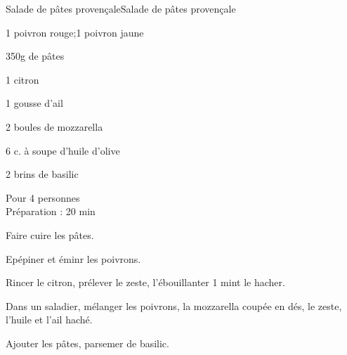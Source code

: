 \begin{recette}{Salade de pâtes provençale}{Salade de pâtes provençale}

\begin{ingredients}
1 poivron rouge;1 poivron jaune\par
350g de pâtes\par
1 citron\par
1 gousse d'ail\par
2 boules de mozzarella\par
6 c. à soupe d'huile d'olive\par
2 brins de basilic\par
\end{ingredients}

\begin{infos}
Pour 4 personnes\\
Préparation : 20 min\\
\end{infos}

\begin{etapes}
\item Faire cuire les pâtes.
\item Epépiner et éminr les poivrons.
\item Rincer le citron, prélever le zeste, l'ébouillanter 1 mint le hacher.
\item Dans un saladier, mélanger les poivrons, la mozzarella coupée en dés, le zeste, l'huile et l'ail haché.
\item Ajouter les pâtes, parsemer de basilic.
\end{etapes}

\end{recette}